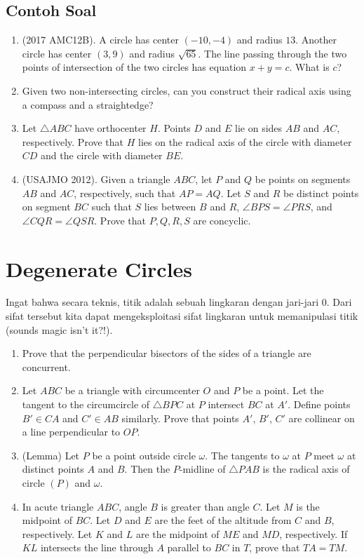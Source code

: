 \documentclass[12pt]{scrartcl}
\begin{document}
\subsection{Contoh Soal}
\begin{enumerate}
    \item (2017 AMC12B). A circle has center $(-10, -4)$ and radius $13$. Another circle has center $(3, 9)$ and radius $\sqrt{65}$. The line passing through the two points of intersection of the two circles has equation $x + y = c$. What is $c$?
\item Given two non-intersecting circles, can you construct their radical axis using a compass and a straightedge?
\item Let $\triangle ABC$ have orthocenter $H$. Points $D$ and $E$ lie on sides $AB$ and $AC$, respectively. Prove that $H$ lies on the radical axis of the circle with diameter $CD$ and the circle with diameter $BE$.
\item (USAJMO 2012). Given a triangle $ABC$, let $P$ and $Q$ be points on segments $AB$ and $AC$, respectively, such that $AP = AQ$. Let $S$ and $R$ be distinct points on segment $BC$ such that $S$ lies between $B$ and $R$, $\angle BPS = \angle PRS$, and $\angle CQR = \angle QSR$. Prove that $P, Q, R, S$ are concyclic.

 \end{enumerate}

 \section{Degenerate Circles}
Ingat bahwa secara teknis, titik adalah sebuah lingkaran dengan jari-jari 0. Dari sifat tersebut kita dapat mengeksploitasi sifat lingkaran untuk memanipulasi titik (sounds magic isn't it?!).

\begin{enumerate}
    \item Prove that the perpendicular bisectors of the sides of a triangle are concurrent.
\item Let $ABC$ be a triangle with circumcenter $O$ and $P$ be a point. Let the tangent to the circumcircle of $\triangle BPC$ at $P$ intersect $BC$ at $A'$. Define points $B' \in CA$ and $C' \in AB$ similarly. Prove that points $A'$, $B'$, $C'$ are collinear on a line perpendicular to $OP$.
\item (Lemma) Let $P$ be a point outside circle $\omega$. The tangents to $\omega$ at $P$ meet $\omega$ at distinct points $A$ and $B$. Then the $P$-midline of $\triangle PAB$ is the radical axis of circle $(P)$ and $\omega$.
\item In acute triangle $ABC$, angle $B$ is greater than angle $C$. Let $M$ is the midpoint of $BC$. Let $D$ and $E$ are the feet of the altitude from $C$ and $B$, respectively. Let $K$ and $L$ are the midpoint of $ME$ and $MD$, respectively. If $KL$ intersects the line through $A$ parallel to $BC$ in $T$, prove that $TA = TM$.
\end{enumerate}
\end{document}
